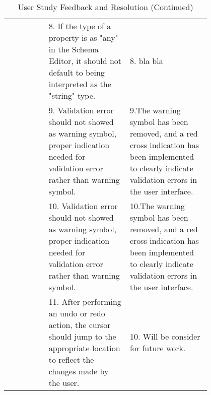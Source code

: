 \begin{table*}
\begin{tabular}{|c|p{0.4\linewidth}|p{0.4\linewidth}|}
        \cline{2-3}
        & 8. If the type of a property is as "any" in the Schema Editor, it should not default to being interpreted as the "string" type. & 8. bla bla \\
        \cline{2-3}
        & 9. Validation error should not showed as warning symbol, proper indication needed for validation error rather than warning symbol. & 9.The warning symbol has been removed, and a red cross indication has been implemented to clearly indicate validation errors in the user interface. \\
        \cline{2-3}
        & 10. Validation error should not showed as warning symbol, proper indication needed for validation error rather than warning symbol. & 10.The warning symbol has been removed, and a red cross indication has been implemented to clearly indicate validation errors in the user interface. \\
        \cline{2-3}
        & 11. After performing an undo or redo action, the cursor should jump to the appropriate location to reflect the changes made by the user.& 10. Will be consider for future work. \\
        \hline
    \end{tabular}
    \caption* {User Study Feedback and Resolution (Continued)}
\end{table*}


\clearpage %


